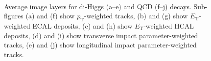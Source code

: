 \begin{figure}[!ht]
\begin{center}
   \\
\caption{Average image layers for di-Higgs (a--e) and QCD (f--j) decays. Sub-figures (a) and (f) show $p_{\textrm{T}}$-weighted tracks, (b) and (g) show $E_{\textrm{T}}$-weighted ECAL deposits, (c) and (h) show $E_{\textrm{T}}$-weighted HCAL deposits, (d) and (i) show transverse impact parameter-weighted tracks, (e) and (j) show longitudinal impact parameter-weighted tracks.} %
\end{center}
\label{fig:cnn_avgImages}
\end{figure}

